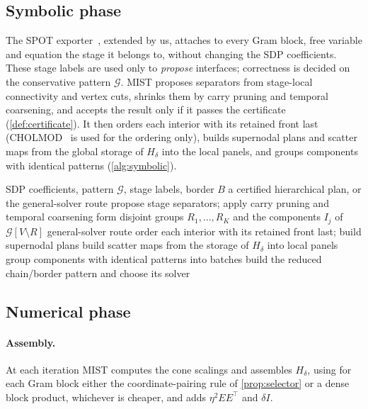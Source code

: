 \subsection{Symbolic phase}

The SPOT exporter~\cite{kang2025spot}, extended by us, attaches to every Gram
block, free variable and equation the stage it belongs to, without changing the SDP
coefficients. These stage labels are used only to \emph{propose} interfaces;
correctness is decided on the conservative pattern $\mathcal G$. MIST proposes
separators from stage-local connectivity and vertex cuts, shrinks them by carry
pruning and temporal coarsening, and accepts the result only if it passes the
certificate (\cref{def:certificate}). It then orders each interior with its
retained front last (CHOLMOD~\cite{chen2008cholmod} is used for the ordering only),
builds supernodal plans and scatter maps from the global storage of $H_\delta$ into
the local panels, and groups components with identical patterns
(\cref{alg:symbolic}).

\begin{algorithm}[htbp]
\caption{Symbolic phase (once per problem)}\label{alg:symbolic}
\small
\begin{algorithmic}[1]
\Require SDP coefficients, pattern $\mathcal G$, stage labels, border $B$
\Ensure a certified hierarchical plan, or the general-solver route
\State propose stage separators; apply carry pruning and temporal coarsening
\State form disjoint groups $R_1,\ldots,R_K$ and the components $I_j$ of $\mathcal G[V\setminus R]$
 \State \Return general-solver route \EndIf
\State order each interior with its retained front last; build supernodal plans
\State build scatter maps from the storage of $H_\delta$ into local panels
\State group components with identical patterns into batches
\State build the reduced chain/border pattern and choose its solver
\end{algorithmic}
\end{algorithm}

\subsection{Numerical phase}\label{sec:local-factor}

\paragraph{Assembly.}
At each iteration MIST computes the cone scalings and assembles $H_\delta$, using
for each Gram block either the coordinate-pairing rule of \cref{prop:selector} or a
dense block product, whichever is cheaper, and adds $\eta^2EE^\top$ and $\delta I$.

